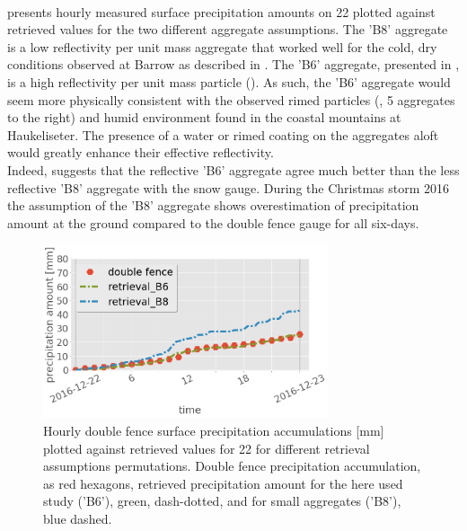 \\
 presents hourly measured surface precipitation amounts on \SI{22}{\dec} plotted against retrieved values for the two different aggregate assumptions. The 'B8' aggregate is a low reflectivity per unit mass aggregate that worked well for the cold, dry conditions observed at Barrow as described in \citet{cooper_variational_2017}. The 'B6' aggregate, presented in , is a high reflectivity per unit mass particle ().  As such, the 'B6' aggregate would seem more physically consistent with the observed rimed particles (, 5 aggregates to the right) and humid environment found in the coastal mountains at Haukeliseter.  The presence of a water or rimed coating on the aggregates aloft would greatly enhance their effective reflectivity. 
\\
Indeed,  suggests that the reflective 'B6' aggregate agree much better than the less reflective 'B8' aggregate with the snow gauge. During the Christmas storm 2016 the assumption of the 'B8' aggregate shows overestimation of precipitation amount at the ground compared to the double fence gauge for all six-days.
%
\\
\begin{figure}[t!]
	\centering
	\includegraphics[width=0.75\textwidth]{./fig_obs_ret/20161222_2}
	\caption{Hourly double fence surface precipitation accumulations [mm] plotted against retrieved values for \SI{22}{\dec} for different retrieval assumptions permutations. Double fence precipitation accumulation, as red hexagons, retrieved precipitation amount for the here used study ('B6'), green, dash-dotted, and for small aggregates ('B8'), blue dashed.}\label{fig:ret_sensitivity}
\end{figure}

